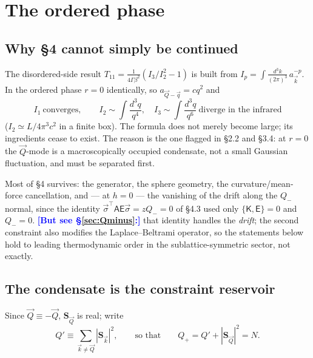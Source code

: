 \documentclass[11pt,a4paper]{article}
\newcommand{\bk}{\vec k}
\newcommand{\bQ}{\vec Q}
\newcommand{\bq}{\vec q}
\newcommand{\dk}{\frac{d^3k}{(2\pi)^3}}
\newcommand{\FLAG}[1]{\textcolor{blue}{\textbf{[#1]}}}
\newcommand{\Em}{\mathsf{E}}
\newcommand{\Tm}{T}
\newcommand{\bk}{\vec k}
\newcommand{\bQ}{\vec Q}
\newcommand{\bq}{\vec q}
\newcommand{\bs}{\vec\sigma}
\newcommand{\dk}{\frac{d^3k}{(2\pi)^3}}
\newcommand{\FLAG}[1]{\textcolor{blue}{\textbf{[#1]}}}
\begin{document}
\section{The ordered phase}

\subsection{Why \S4 cannot simply be continued}
The disordered-side result $\Tm_{11}=\frac{1}{4\Gamma\beta^2}(I_3/I_2^2-1)$ is built from
$I_p=\int\!\dk\,a_{\bk}^{-p}$. In the ordered phase $r=0$ identically, so
$a_{\bQ-\bq}=cq^2$ and
\begin{equation}
  I_1\ \text{converges},
  \qquad
  I_2\sim\int\!\frac{d^3q}{q^4},\quad I_3\sim\int\!\frac{d^3q}{q^6}\ \text{diverge in the infrared}
\end{equation}
($I_2\simeq L/4\pi^3c^2$ in a finite box). The formula does not merely become large; its
ingredients cease to exist. The reason is the one flagged in \S2.2 and \S3.4: at $r=0$ the
$\bQ$-mode is a macroscopically occupied condensate, not a small Gaussian fluctuation, and
must be separated first.

Most of \S4 survives: the generator, the sphere geometry, the curvature/mean-force
cancellation, and --- at $h=0$ --- the vanishing of the drift along the $Q_-$ normal, since
the identity $\bs^\top\mathsf A\Em\bs=zQ_-=0$ of \S4.3 used only $\{\mathsf K,\Em\}=0$ and
$Q_-=0$. \FLAG{But see \S\ref{sec:Qminus}:} that identity handles the \emph{drift}; the
second constraint also modifies the Laplace--Beltrami operator, so the statements below hold
to leading thermodynamic order in the sublattice-symmetric sector, not exactly.

\subsection{The condensate is the constraint reservoir}
Since $\bQ\equiv-\bQ$, $\bm S_{\bQ}$ is real; write
\begin{equation}
  Q'\equiv\sum_{\bk\neq\bQ}|\bm S_{\bk}|^2 ,
  \qquad\text{so that}\qquad
  Q_+=Q'+|\bm S_{\bQ}|^2=N .
  \label{eq:split}
\end{equation}
\end{document}
